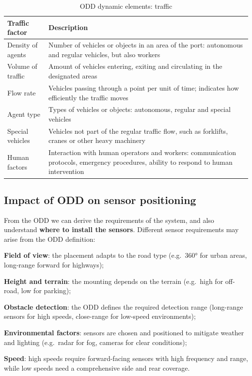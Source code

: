 \begin{table}[H]
    \centering
    \small
    \begin{tabular}{|p{3cm}|p{12.2cm}|}
        \hline
        \textbf{Traffic factor} & \textbf{Description} \\
        \hline
        Density of agents & Number of vehicles or objects in an area of the port: autonomous and regular vehicles, but also workers \\
        \hline
        Volume of traffic & Amount of vehicles entering, exiting and circulating in the designated areas \\
        \hline
        Flow rate & Vehicles passing through a point per unit of time; indicates how efficiently the traffic moves \\
        \hline
        Agent type & Types of vehicles or objects: autonomous, regular and special vehicles \\
        \hline
        Special vehicles & Vehicles not part of the regular traffic flow, such as forklifts, cranes or other heavy machinery \\
        \hline
        Human factors & Interaction with human operators and workers: communication protocols, emergency procedures, ability to respond to human intervention \\
        \hline
    \end{tabular}
    \caption{ODD dynamic elements: traffic}
\end{table}

\subsection{Impact of ODD on sensor positioning}
From the ODD we can derive the requirements of the system, and also understand \textbf{where to install the sensors}.
Different sensor requirements may arise from the ODD definition:
\begin{compactitemize}
    \item \textbf{Field of view}: the placement adapts to the road type (e.g.\ 360° for urban areas, long-range forward for highways);
    \item \textbf{Height and terrain}: the mounting depends on the terrain (e.g.\ high for off-road, low for parking);
    \item \textbf{Obstacle detection}: the ODD defines the required detection range (long-range sensors for high speeds, close-range for low-speed environments);
    \item \textbf{Environmental factors}: sensors are chosen and positioned to mitigate weather and lighting (e.g.\ radar for fog, cameras for clear conditions);
    \item \textbf{Speed}: high speeds require forward-facing sensors with high frequency and range, while low speeds need a comprehensive side and rear coverage.
\end{compactitemize}

